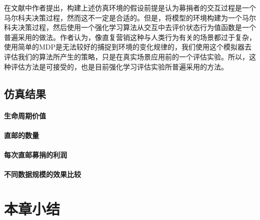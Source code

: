 在文献\citep{pednault2002sequential}中作者提出，构建上述仿真环境的假设前提是认为募捐者的交互过程是一个马尔科夫决策过程，然而这不一定是合适的。但是，将模型的环境构建为一个马尔科夫决策过程，然后使用一个强化学习算法从交互中去评价状态行为值函数是一个普遍采用的做法。作者认为，像直复营销这种与人类行为有关的场景都过于复杂，使用简单的MDP是无法较好的捕捉到环境的变化规律的，我们使用这个模拟器去评估我们的算法所产生的策略，只是在真实场景应用前的一个评估实验。所以，这种评估方法是可接受的，也是目前强化学习评估实验所普遍采用的方法。

\subsection{仿真结果}

\paragraph{生命周期价值}

\paragraph{直邮的数量}

\paragraph{每次直邮募捐的利润}

\paragraph{不同数据规模的效果比较}

\section{本章小结}
